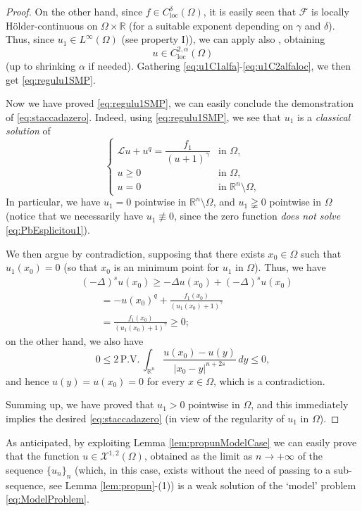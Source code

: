 \documentclass[11pt,a4paper]{amsart}
\def \R {\mathbb{R}}
\theoremstyle{definition}
\theoremstyle{plain}
\numberwithin{equation}{section}
\begin{document}
{\begin{proof}
	On the other hand, since $f\in C^{\delta}_{\mathrm{loc}}(\Omega)$,
	it is easily seen that $\mathcal{F}$ is locally H\"older-con\-ti\-nuous on $\Omega\times\R$
	(for a suitable exponent depending on $\gamma$ and $\delta$). Thus,
	since $u_1\in L^\infty(\Omega)$ (see property I)), we can apply also 
	\cite[Theorem 1.5]{SVWZ2}, obtaining 
	\begin{equation} \label{eq:u1C2alfaloc}
		u\in C^{2,\alpha}_{\mathrm{loc}}(\Omega)
	\end{equation}
	(up to shrinking $\alpha$ if needed). Gathering \eqref{eq:u1C1alfa}-\eqref{eq:u1C2alfaloc}, we then
	get \eqref{eq:regulu1SMP}.
	\vspace*{0.1cm}
	
	Now we have proved \eqref{eq:regulu1SMP}, we can easily conclude
	the demonstration of \eqref{eq:staccadazero}. Indeed, using \eqref{eq:regulu1SMP},
	we see that $u_1$ is a \emph{classical solution} of 
	\begin{equation} \label{eq:PbEsplicitou1}
		\begin{cases}
			\mathcal{L}u+ u^q  = \dfrac{f_1}{(u+1)^\gamma} & \textrm{in } \Omega,\\
			u \geq 0 & \textrm{in } \Omega,\\
			u = 0 & \textrm{in } \mathbb{R}^{n}\setminus \Omega,
		\end{cases}
	\end{equation}
	In particular, we have $u_1 = 0$ pointwise in $\R^n\setminus\Omega$, and $u_1\gneqq 0$
	pointwise in $\Omega$ (notice that we necessarily have $u_1\not\equiv 0$, since
	the zero function \emph{does not solve} \eqref{eq:PbEsplicitou1}).
	
	We then argue by contradiction, supposing that there exists $x_0\in\Omega$ such that $u_1(x_0) = 0$
	(so that $x_0$ is an minimum point for $u_1$ in $\Omega$). Thus, we have
	\begin{align*}
		& (-\Delta)^s u(x_0) \geq  -\Delta u(x_0) + (-\Delta)^s u(x_0) \\
		& \qquad = -u(x_0)^q+\frac{f_1(x_0)}{(u_1(x_0)+1)^\gamma} 
		\\
		& \qquad = \frac{f_1(x_0)}{(u_1(x_0)+1)^\gamma} \geq 0;
	\end{align*}
	on the other hand, we also have
	$$0\leq 2\,\mathrm{P.V.}\,\int_{\R^n}\frac{u(x_0)-u(y)}{|x_0-y|^{n+2s}}\,dy\leq 0,$$
	and hence $u(y) = u(x_0) = 0$ for every $x\in\Omega$, which is a contradiction.
	
	Summing up, we have proved that $u_1 > 0$ pointwise in $\Omega$, and
	this immediately implies the desired \eqref{eq:staccadazero}
	(in view of the regularity of $u_1$ in $\Omega$).
\end{proof}
As anticipated, by exploiting Lemma \ref{lem:propunModelCase} we can easily prove
that the function $u\in\mathcal{X}^{1,2}(\Omega)$, obtained
as the limit as $n\to+\infty$ of the sequence $\{u_n\}_n$ (which, in this case,
exists without the need
of passing to a sub-sequence, see Lemma \ref{lem:propun}-(1))
is a weak solution of the `model' problem \eqref{eq:ModelProblem}.
\vspace*{0.1cm}

}
\end{document}
